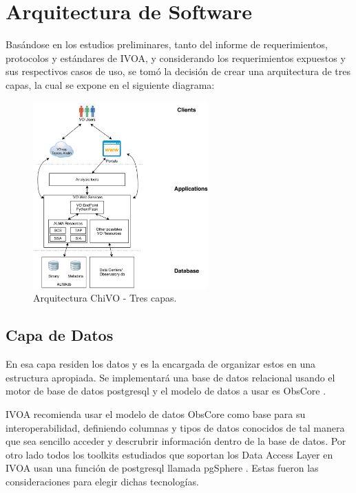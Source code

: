\section{Arquitectura de Software}

Basándose en los estudios preliminares, tanto del informe de requerimientos,
protocolos y estándares de IVOA, y considerando los requerimientos expuestos y
sus respectivos casos de uso, se tomó la decisión de crear una arquitectura de
tres capas, la cual se expone en el siguiente diagrama:
\vspace{1.0cm}
\begin{figure}[h!t]
    \begin{center}
        \includegraphics[width=0.6\textwidth]{img/chivo_capas.png}
        \caption{Arquitectura ChiVO - Tres capas.}
    \end{center}
\end{figure}

\subsection{Capa de Datos}
En esa capa residen los datos y es la encargada de organizar estos en una
estructura apropiada. Se implementará una base de datos relacional usando el
motor de base de datos postgresql \cite{psql} y el modelo de datos a usar es
ObsCore \cite{obscore}.

IVOA recomienda usar el modelo de datos ObsCore como base para su
interoperabilidad, definiendo columnas y tipos de datos conocidos de tal manera
que sea sencillo acceder y descrubrir información dentro de la base de datos.
Por otro lado todos los toolkits estudiados que soportan los Data Access Layer
en IVOA usan una función de postgresql llamada pgSphere \cite{pgsphere}. Estas
fueron las consideraciones para elegir dichas tecnologías.


